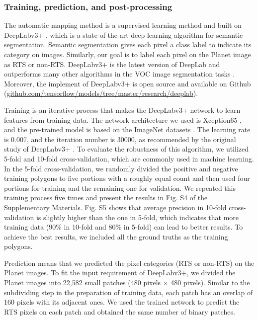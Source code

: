 \documentclass[preprint,12pt,authoryear]{elsarticle}
\begin{document}
\subsubsection{Training, prediction, and post-processing}
\label{subsubsec_deeplab}

The automatic mapping method is a supervised learning method and built on DeepLabv3+ \citep{chen_encoder-decoder_2018}, which is a state-of-the-art deep learning algorithm for semantic segmentation. Semantic segmentation gives each pixel a class label to indicate its category on images. Similarly, our goal is to label each pixel on the Planet image as RTS or non-RTS. DeepLabv3+ is the latest version of DeepLab and outperforms many other algorithms in the VOC image segmentation tasks \citep{everingham_pascal_2015}. Moreover, the implement of DeepLabv3+ is open source and available on Github (\url{github.com/tensorflow/models/tree/master/research/deeplab}).

Training is an iterative process that makes the DeepLabv3+ network to learn features from training data. The network architecture we used is Xception65 \citep{chollet2017xception}, and the pre-trained model is based on the ImageNet datasets \citep{russakovsky2015imagenet}. The learning rate is 0.007, and the iteration number is 30000, as recommended by the original study of DeepLabv3+ \citep{chen_encoder-decoder_2018}. To evaluate the robustness of this algorithm, we utilized 5-fold and 10-fold cross-validation, which are commonly used in machine learning. In the 5-fold cross-validation, we randomly divided the positive and negative training polygons to five portions with a roughly equal count and then used four portions for training and the remaining one for validation. We repeated this training process five times and present the results in Fig. S4 of the Supplementary Materials. Fig. S5 shows that average precision in 10-fold cross-validation is slightly higher than the one in 5-fold, which indicates that more training data (90\% in 10-fold and 80\% in 5-fold) can lead to better results. To achieve the best results, we included all the ground truths as the training polygons. 

Prediction means that we predicted the pixel categories (RTS or non-RTS) on the Planet images. To fit the input requirement of DeepLabv3+, we divided the Planet images into 22,582 small patches (480 pixels $\times$ 480 pixels). Similar to the subdividing step in the preparation of training data, each patch has an overlap of 160 pixels with its adjacent ones. We used the trained network to predict the RTS pixels on each patch and obtained the same number of binary patches. 
\end{document}
